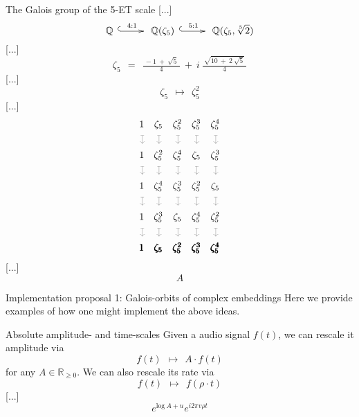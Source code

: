 \documentclass[letterpaper,11pt, reqno]{amsart}
\makeatletter
\newtheorem{monodromy theorem}{Monodromy Theorem}[subsection]
\newtheorem{research objectives}{Research objectives}[subsection]
\newtheorem{research question}[theorem]{Research questions}
\newtheorem{aside question}[theorem]{Aside question}
\newtheorem{blank remark}[theorem]{}
\newtheorem{terminology and comment}[theorem]{Terminology and comment}
\newtheorem{purity hypothesis}[theorem]{Purity hypothesis}
\newtheorem{corollary of the purity hypothesis}[theorem]{Corollary of the purity hypothesis}
\newcommand{\QQ} {{\mathbb Q}}
\newcommand{\RR} {{\mathbb R}}
\newcommand{\mono}{\!\xymatrix{{}\ar@{^{(}->}[r]&{}}\!}
\numberwithin{equation}{theorem}
\makeatother
\begin{document}
\begin{section}{The Galois group of the 5-ET scale}
[...]
	$$
	\QQ\ \overset{4:1}{\mono}\ \QQ(\zeta_5)\ \overset{5:1}{\mono}\ \QQ(\zeta_5, \sqrt[5]{2})
	$$
[...]
	$$
	\zeta_{5}
	\ \ =\ \ 
	\tfrac{\ -1\ \!+\ \!\sqrt{5}\ }{4}\ +\ i\ \tfrac{\ \sqrt{10\ \!+\ \!2\ \!\sqrt{5}}\ }{4}
	$$
[...]
	$$
	\zeta_5\ \ \longmapsto\ \ \zeta^2_5
	$$
[...]
	$$
	\begin{array}{ccccc}
	1 & \zeta_5 & \zeta^2_5 & \zeta^3_5 & \zeta^4_5 \\[-4pt]
	{\color{gray!75}\rotatebox{-90}{$\mapsto$}} & {\color{gray!75}\rotatebox{-90}{$\mapsto$}} & {\color{gray!75}\rotatebox{-90}{$\mapsto$}} & {\color{gray!75}\rotatebox{-90}{$\mapsto$}} & {\color{gray!75}\rotatebox{-90}{$\mapsto$}} \\[12pt]
	1 & \zeta^2_5 & \zeta^4_5 & \zeta_5 & \zeta^3_5 \\[-4pt]
	{\color{gray!75}\rotatebox{-90}{$\mapsto$}} & {\color{gray!75}\rotatebox{-90}{$\mapsto$}} & {\color{gray!75}\rotatebox{-90}{$\mapsto$}} & {\color{gray!75}\rotatebox{-90}{$\mapsto$}} & {\color{gray!75}\rotatebox{-90}{$\mapsto$}} \\[12pt]
	1 & \zeta^4_5 & \zeta^3_5 & \zeta^2_5 & \zeta_5 \\[-4pt]
	{\color{gray!75}\rotatebox{-90}{$\mapsto$}} & {\color{gray!75}\rotatebox{-90}{$\mapsto$}} & {\color{gray!75}\rotatebox{-90}{$\mapsto$}} & {\color{gray!75}\rotatebox{-90}{$\mapsto$}} & {\color{gray!75}\rotatebox{-90}{$\mapsto$}} \\[12pt]
	1 & \zeta^3_5 & \zeta_5 & \zeta^4_5 & \zeta^2_5 \\[-4pt]
	{\color{gray!75}\rotatebox{-90}{$\mapsto$}} & {\color{gray!75}\rotatebox{-90}{$\mapsto$}} & {\color{gray!75}\rotatebox{-90}{$\mapsto$}} & {\color{gray!75}\rotatebox{-90}{$\mapsto$}} & {\color{gray!75}\rotatebox{-90}{$\mapsto$}} \\[12pt]
	\pmb{1} & \pmb{\zeta_5} & \pmb{\zeta^2_5} & \pmb{\zeta^3_5} & \pmb{\zeta^4_5}
	\end{array}
	$$
[...]
	$$
	A
	$$
\end{section}

\begin{section}{Implementation proposal 1: Galois-orbits of complex embeddings}
Here we provide examples of how one might implement the above ideas.

\begin{subsection}{Absolute amplitude- and time-scales}
Given a audio signal $f(t)$, we can rescale it amplitude via
	$$
	f(t)
	\ \ \longmapsto\ \ 
	A\cdot f(t)
	$$
for any $A\in\RR_{\ge 0}$. We can also rescale its rate via
	$$
	f(t)
	\ \ \longmapsto\ \ 
	f(\rho\cdot t)
	$$
[...]
	$$
	e^{\text{log}\ \!A+u}e^{i2\pi v\rho t}
	$$
	
\end{subsection}

\end{section}
\end{document}
